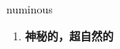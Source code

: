 
\begin{frame}
{\huge numinous}
\begin{center}
\begin{enumerate}\Large
  \item \textbf{神秘的，超自然的}
\end{enumerate}
\end{center}
\end{frame}
